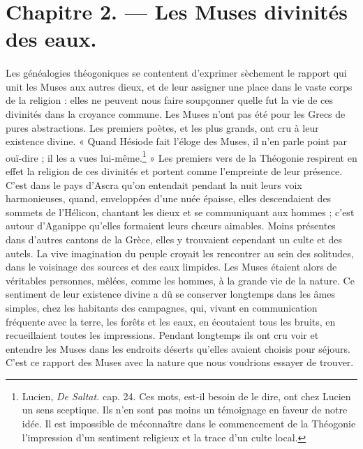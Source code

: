 \documentclass[landscape, a4paper, 11pt, oneside, polutonikogreek, french]{article}
\begin{document}
\section{Chapitre 2. --- Les Muses divinités des eaux.}
\paragraph{}
Les généalogies théogoniques se contentent d'exprimer sèchement le rapport qui unit les Muses aux autres dieux, et de leur assigner une place dans le vaste corps de la religion : elles ne peuvent nous faire soupçonner quelle fut la vie de ces divinités dans la croyance commune. Les Muses n'ont pas été pour les Grecs de pures abstractions. Les premiers poètes, et les plus grands, ont cru à leur existence divine. « Quand Hésiode fait l'éloge des Muses, il n'en parle point par ouï-dire ; il les a vues lui-même.\footnote{Lucien, \emph{De Saltat.} cap. 24. Ces mots, est-il besoin de le dire, ont chez Lucien un sens sceptique. Ils n'en sont pas moins un témoignage en faveur de notre idée. Il est impossible de méconnaître dans le commencement de la Théogonie l'impression d'un sentiment religieux et la trace d'un culte local.} » Les premiers vers de la Théogonie respirent en effet la religion de ces divinités et portent comme l'empreinte de leur présence. C'est dans le pays d'Ascra qu'on entendait pendant la nuit leurs voix harmonieuses, quand, enveloppées d'une nuée épaisse, elles descendaient des sommets de l'Hélicon, chantant les dieux et se communiquant aux hommes ; c'est autour d'Aganippe qu'elles formaient leurs chœurs aimables. Moins présentes dans d'autres cantons de la Grèce, elles y trouvaient cependant un culte et des autels. La vive imagination du peuple croyait les rencontrer au sein des solitudes, dans le voisinage des sources et des eaux limpides. Les Muses étaient alors de véritables personnes, mêlées, comme les hommes, à la grande vie de la nature. Ce sentiment de leur existence divine a dû se conserver longtemps dans les âmes simples, chez les habitants des campagnes, qui, vivant en communication fréquente avec la terre, les forêts et les eaux, en écoutaient tous les bruits, en recueillaient toutes les impressions. Pendant longtemps ils ont cru voir et entendre les Muses dans les endroits déserts qu'elles avaient choisis pour séjours. C'est ce rapport des Muses avec la nature que nous voudrions essayer de trouver.
\end{document}
